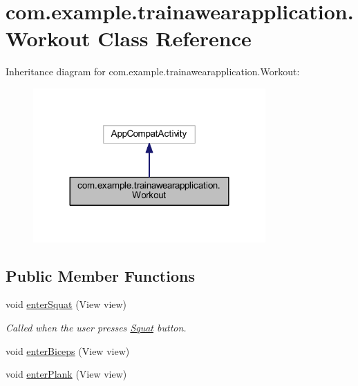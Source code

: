 \hypertarget{classcom_1_1example_1_1trainawearapplication_1_1_workout}{}\section{com.\+example.\+trainawearapplication.\+Workout Class Reference}
\label{classcom_1_1example_1_1trainawearapplication_1_1_workout}


Inheritance diagram for com.\+example.\+trainawearapplication.\+Workout\+:
\nopagebreak
\begin{figure}[H]
\begin{center}
\leavevmode
\includegraphics[width=252pt]{classcom_1_1example_1_1trainawearapplication_1_1_workout__inherit__graph}
\end{center}
\end{figure}
\subsection*{Public Member Functions}
\begin{DoxyCompactItemize}
\item 
void \mbox{\hyperlink{classcom_1_1example_1_1trainawearapplication_1_1_workout_a5920ce94b756559297e72c55d7840590}{enter\+Squat}} (View view)
\begin{DoxyCompactList}\small\item\em Called when the user presses \mbox{\hyperlink{classcom_1_1example_1_1trainawearapplication_1_1_squat}{Squat}} button. \end{DoxyCompactList}\item 
void \mbox{\hyperlink{classcom_1_1example_1_1trainawearapplication_1_1_workout_a394e2b083ee2f81e83d424a1054b8724}{enter\+Biceps}} (View view)
\item 
void \mbox{\hyperlink{classcom_1_1example_1_1trainawearapplication_1_1_workout_a1f31842be78a46953f64aa6615b1dc93}{enter\+Plank}} (View view)
\end{DoxyCompactItemize}
